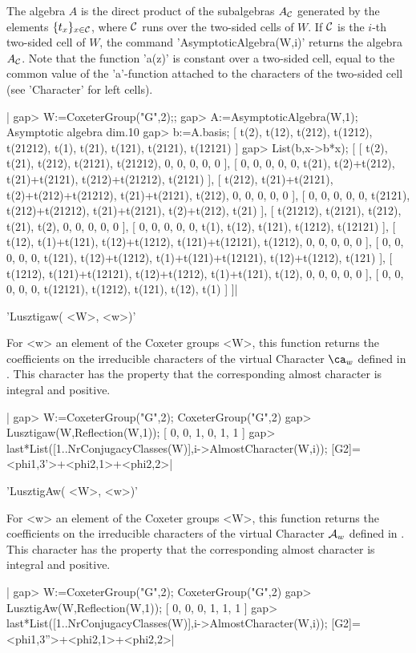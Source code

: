 The  algebra $A$ is the direct product of the subalgebras $A_{\mathcal C}$ generated
by  the elements $\{t_x\}_{x\in{\mathcal C}}$,  where ${\mathcal C}$ runs  over the two-sided
cells  of $W$. If  ${\mathcal C}$ is the  $i$-th two-sided cell  of $W$, the command
'AsymptoticAlgebra(W,i)'   returns  the  algebra  $A_{\mathcal C}$.  Note  that  the
function  'a(z)' is  constant over  a two-sided  cell, equal  to the common
value  of the 'a'-function attached to the characters of the two-sided cell
(see 'Character' for left cells).

|    gap> W:=CoxeterGroup("G",2);;
    gap> A:=AsymptoticAlgebra(W,1);
    Asymptotic algebra dim.10
    gap> b:=A.basis;
    [ t(2), t(12), t(212), t(1212), t(21212), t(1), t(21), t(121),
      t(2121), t(12121) ]
    gap> List(b,x->b*x);
    [ [ t(2), t(21), t(212), t(2121), t(21212), 0, 0, 0, 0, 0 ],
      [ 0, 0, 0, 0, 0, t(21), t(2)+t(212), t(21)+t(2121), t(212)+t(21212),
          t(2121) ],
      [ t(212), t(21)+t(2121), t(2)+t(212)+t(21212), t(21)+t(2121),
          t(212), 0, 0, 0, 0, 0 ],
      [ 0, 0, 0, 0, 0, t(2121), t(212)+t(21212), t(21)+t(2121),
          t(2)+t(212), t(21) ],
      [ t(21212), t(2121), t(212), t(21), t(2), 0, 0, 0, 0, 0 ],
      [ 0, 0, 0, 0, 0, t(1), t(12), t(121), t(1212), t(12121) ],
      [ t(12), t(1)+t(121), t(12)+t(1212), t(121)+t(12121), t(1212), 0,
          0, 0, 0, 0 ],
      [ 0, 0, 0, 0, 0, t(121), t(12)+t(1212), t(1)+t(121)+t(12121),
          t(12)+t(1212), t(121) ],
      [ t(1212), t(121)+t(12121), t(12)+t(1212), t(1)+t(121), t(12), 0,
          0, 0, 0, 0 ],
      [ 0, 0, 0, 0, 0, t(12121), t(1212), t(121), t(12), t(1) ] ]|


'Lusztigaw( <W>, <w>)'

For  <w> an element  of the Coxeter  groups <W>, this  function returns the
coefficients on the irreducible characters of the virtual Character $\ca_w$
defined  in \cite[5.10.2]{Lus85}. This character  has the property that the
corresponding almost character is integral and positive.

|    gap> W:=CoxeterGroup("G",2);
    CoxeterGroup("G",2)
    gap> Lusztigaw(W,Reflection(W,1));
    [ 0, 0, 1, 0, 1, 1 ]
    gap> last*List([1..NrConjugacyClasses(W)],i->AlmostCharacter(W,i));
    [G2]=<phi{1,3}'>+<phi{2,1}>+<phi{2,2}>|


'LusztigAw( <W>, <w>)'

For  <w> an element  of the Coxeter  groups <W>, this  function returns the
coefficients on the irreducible characters of the virtual Character ${\mathcal A}_w$
defined  in \cite[5.10.2]{Lus85}. This character  has the property that the
corresponding almost character is integral and positive.

|    gap> W:=CoxeterGroup("G",2);
    CoxeterGroup("G",2)
    gap> LusztigAw(W,Reflection(W,1));
    [ 0, 0, 0, 1, 1, 1 ]
    gap> last*List([1..NrConjugacyClasses(W)],i->AlmostCharacter(W,i));
    [G2]=<phi{1,3}''>+<phi{2,1}>+<phi{2,2}>|
